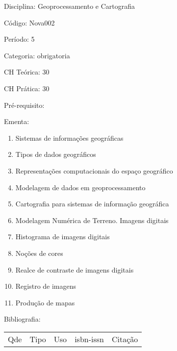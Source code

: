 \documentclass[12pt,a4paper,twoside]{report}
\begin{document}
Disciplina: Geoprocessamento e Cartografia

Código: Nova002

Período: 5

Categoria: obrigatoria

CH Teórica: 30

CH Prática: 30




Pré-requisito:
\begin{enumerate}
\end{enumerate}

Ementa:
\begin{enumerate}
\item Sistemas de informações geográficas
\item Tipos de dados geográficos
\item Representações computacionais do espaço geográfico
\item Modelagem de dados em geoprocessamento
\item Cartografia para sistemas de informação geográfica
\item Modelagem Numérica de Terreno. Imagens digitais
\item Histograma de imagens digitais
\item Noções de cores
\item Realce de contraste de imagens digitais
\item Registro de imagens
\item Produção de mapas
\end{enumerate}



Bibliografia:


\begin{tabular}{llllp{8cm}}
Qde & Tipo & Uso & isbn-issn & Citação \\
\end{tabular}
\end{document}

